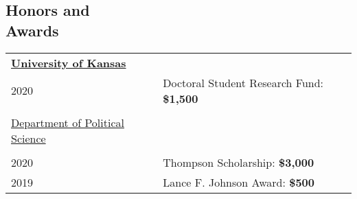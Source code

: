 \documentclass[margin,line,pifont,palatino,courier]{res}
\begin{document}
\begin{resume}
\section{\sc Honors and\\ Awards}

\begin{tabular}{ll}
  \textbf{\underline{University of Kansas}} &\\
  2020       & Doctoral Student Research Fund: \bf{\$1,500}\\
  \\
  \underline{Department of Political Science}&\\
  \\
  2020       & Thompson Scholarship: \bf{\$3,000}\\
  2019       & Lance F. Johnson Award: \bf{\$500}\\

\end{tabular}
\end{resume}
\end{document}
